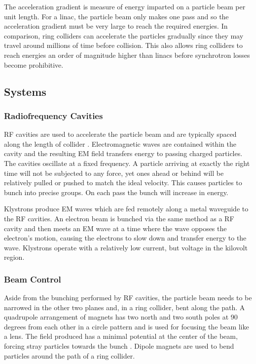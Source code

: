  The acceleration gradient is measure of energy imparted on a particle beam per unit length. For a linac, the particle beam only makes one pass and so the acceleration gradient must be very large to reach the required energies. In comparison, ring colliders can accelerate the particles gradually since they may travel around millions of time before collision. This also allows ring colliders to reach energies an order of magnitude higher than linacs before synchrotron losses become prohibitive.
 
 \subsection{Systems}
 \subsubsection{Radiofrequency Cavities}
 
 RF cavities are used to accelerate the particle beam and are typically spaced along the length of collider \cite{CERN:RFCAV}. Electromagnetic waves 
are contained within the cavity and the resulting EM field transfers energy to passing charged particles. The cavities oscillate at a fixed frequency. A particle arriving at exactly the right time will not be subjected to any force, yet ones ahead or behind will be relatively pulled or pushed to match the ideal velocity. This causes particles to bunch into precise groups. On each pass the bunch will increase in energy.

Klystrons produce EM waves which are fed remotely along a metal waveguide to  the RF cavities. An electron beam is bunched via the same method as a RF cavity and then meets an EM wave at a time where the wave opposes the electron's motion, causing the electrons to slow down and transfer energy to the wave. Klystrons operate with a relatively low current, but voltage in the kilovolt region.
 
 \subsubsection{Beam Control}
 
 Aside from the bunching performed by RF cavities, the particle beam needs to be narrowed in the other two planes and, in a ring collider, bent along the path. A quadrupole arrangement of magnets has two north and two south poles at 90 degrees from each other in a circle pattern and is used for focusing the beam like a lens. The field produced has a minimal potential at the center of the beam, forcing stray particles towards the bunch \cite{ILC:BeamFocusing}. Dipole magnets are used to bend particles around the path of a ring collider. 
 
